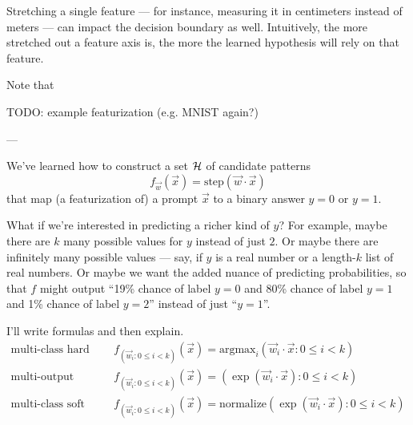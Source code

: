 \documentclass[11pt, justified]{tufte-book}
\newcommand{\attnsam}[1]{{\red \textsf{#1}}}
\newcommand{\sampassage}[1]{
   \vspace{0.1cm}
   \par\noindent{\hspace{-2cm}\normalsize \sc \gre #1} ---
}
\newcommand{\sfx}{\mathsf{x}}\newcommand{\frx}{\mathcal{x}}
\newcommand{\sfy}{\mathsf{y}}\newcommand{\fry}{\mathcal{y}}
\theoremstyle{definition}
\begin{document}
        Stretching a single feature --- for instance, measuring it in
        centimeters instead of meters --- can impact the decision boundary
        as well.  Intuitively, the more stretched out a feature axis is, 
        the more the learned hypothesis will rely on that feature.

        Note that


        \attnsam{TODO: example featurization (e.g. MNIST again?)}


      \sampassage{richer outputs: larger $\yY$} 
        We've learned how to construct a set $\mathcal{H}$ of candidate patterns 
        $$
          f_{\vec w}(\vec x) = \text{step}(\vec w\cdot \vec x) 
        $$
        that map (a featurization of) a prompt $\vec x$ to a binary answer
        $y=0$ or $y=1$.

        What if we're interested in predicting a richer kind of $y$?  For
        example, maybe there are $k$ many possible values for $y$ instead of
        just $2$.  Or maybe there are infinitely many possible values --- say,
        if $y$ is a real number or a length-$k$ list of real numbers.  Or maybe
        we want the added nuance of predicting probabilities, so that $f$ might
        output ``19\% chance of label $y=0$ and 80\% chance of label $y=1$ and
        1\% chance of label $y=2$''
        instead of just ``$y=1$''. 

        I'll write formulas and then explain.
        \begin{align*}
            \text{multi-class hard classification}\quad&
            f_{(\vec w_i : 0\leq i < k)}(\vec x) = \text{argmax}_i(\vec w_i\cdot \vec x : 0\leq i<k) 
        \\
            \text{multi-output regression}\quad&
            f_{(\vec w_i  : 0\leq i < k)}(\vec x) = (\exp(\vec w_i \cdot \vec x) : 0\leq i < k)
        \\
            \text{multi-class soft classification}\quad&
            f_{(\vec w_i  : 0\leq i < k)}(\vec x) = \text{normalize}(\exp(\vec w_i \cdot \vec x) : 0\leq i < k)
        \end{align*}
\end{document}
